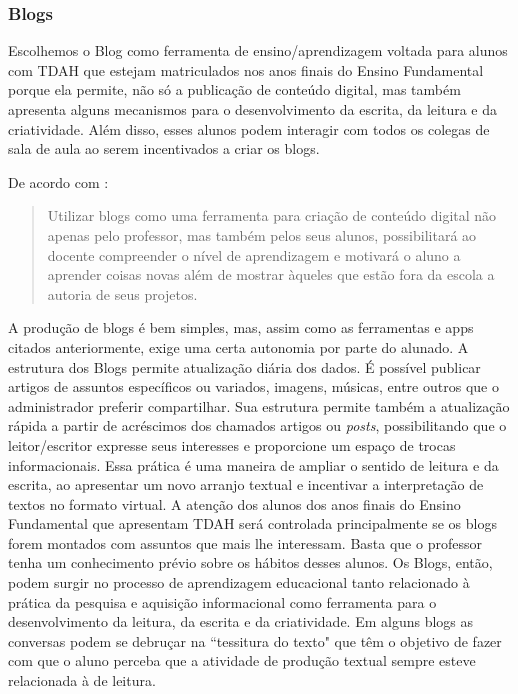 \documentclass{textolivre}
\begin{document}
\subsubsection{Blogs}\label{sec-blogs}
Escolhemos o Blog como ferramenta de ensino/aprendizagem voltada para alunos com TDAH que estejam matriculados nos anos finais do Ensino Fundamental porque ela permite, não só a publicação de conteúdo digital, mas também apresenta alguns mecanismos para o desenvolvimento da escrita, da leitura e da criatividade. Além disso, esses alunos podem interagir com todos os colegas de sala de aula ao serem incentivados a criar os blogs.

De acordo com \textcite[p. 8]{girafa_reinvencao_2012}:

\begin{quote}
Utilizar blogs como uma ferramenta para criação de conteúdo digital não apenas pelo professor, mas também pelos seus alunos, possibilitará ao docente compreender o nível de aprendizagem e motivará o aluno a aprender coisas novas além de mostrar àqueles que estão fora da escola a autoria de seus projetos.  
\end{quote}

A produção de blogs é bem simples, mas, assim como as ferramentas e apps citados anteriormente, exige uma certa autonomia por parte do alunado. A estrutura dos Blogs permite atualização diária dos dados. É possível publicar artigos de assuntos específicos ou variados, imagens, músicas, entre outros que o administrador preferir compartilhar. Sua estrutura permite também a atualização rápida a partir de acréscimos dos chamados artigos ou \textit{posts}, possibilitando que o leitor/escritor expresse seus interesses e proporcione um espaço de trocas informacionais. Essa prática é uma maneira de ampliar o sentido de leitura e da escrita, ao apresentar um novo arranjo textual e incentivar a interpretação de textos no formato virtual. A atenção dos alunos dos anos finais do Ensino Fundamental que apresentam TDAH será controlada principalmente se os blogs forem montados com assuntos que mais lhe interessam. Basta que o professor tenha um conhecimento prévio sobre os hábitos desses alunos. Os Blogs, então, podem surgir no processo de aprendizagem educacional tanto relacionado à prática da pesquisa e aquisição informacional como ferramenta para o desenvolvimento da leitura, da escrita e da criatividade. Em alguns blogs as conversas podem se debruçar na “tessitura do texto" que têm o objetivo de fazer com que o aluno perceba que a atividade de produção textual sempre esteve relacionada à de leitura. 
\end{document}
